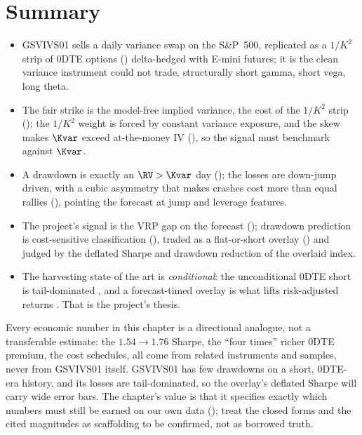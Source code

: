 \section{Summary}
\label{sec:gsvivs:summary}

\begin{keyresult}
\begin{itemize}
  \item GSVIVS01 sells a daily variance swap on the S\&P~500, replicated as a $1/K^2$ strip of 0DTE options () delta-hedged with E-mini futures; it is the clean variance instrument  could not trade, structurally short gamma, short vega, long theta.
  \item The fair strike is the model-free implied variance, the cost of the $1/K^2$ strip (); the $1/K^2$ weight is forced by constant variance exposure, and the skew makes $\Kvar$ exceed at-the-money IV (), so the signal must benchmark against $\Kvar$.
  \item A drawdown is exactly an $\RV > \Kvar$ day (); the losses are down-jump driven, with a cubic asymmetry that makes crashes cost more than equal rallies (), pointing the forecast at jump and leverage features.
  \item The project's signal is the VRP gap on the forecast (); drawdown prediction is cost-sensitive classification (), traded as a flat-or-short overlay () and judged by the deflated Sharpe and drawdown reduction of the overlaid index.
  \item The harvesting state of the art is \emph{conditional}: the unconditional 0DTE short is tail-dominated \citep{Vilkov2024}, and a forecast-timed overlay is what lifts risk-adjusted returns \citep{Yang2024}. That is the project's thesis.
\end{itemize}
\end{keyresult}

\begin{warning}
Every economic number in this chapter is a directional analogue, not a transferable estimate: the $1.54\to1.76$ Sharpe, the ``four times'' richer 0DTE premium, the cost schedules, all come from related instruments and samples, never from GSVIVS01 itself. GSVIVS01 has few drawdowns on a short, 0DTE-era history, and its losses are tail-dominated, so the overlay's deflated Sharpe will carry wide error bars. The chapter's value is that it specifies exactly which numbers must still be earned on our own data (); treat the closed forms and the cited magnitudes as scaffolding to be confirmed, not as borrowed truth.
\end{warning}

